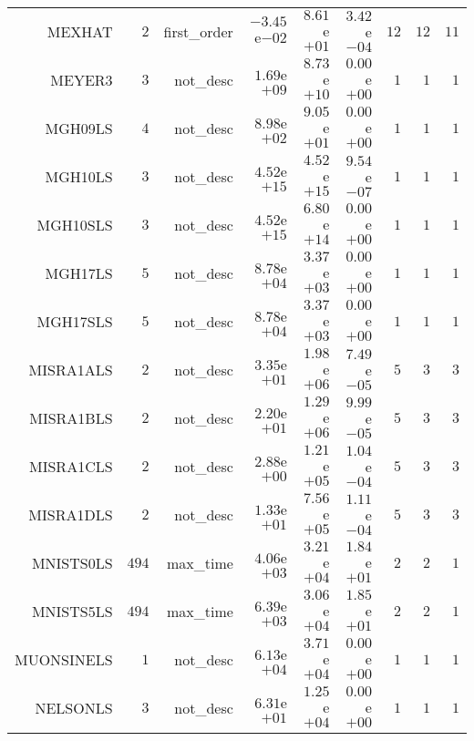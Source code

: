 \begin{longtable}{rrrrrrrrr}
MEXHAT & \(     2\) & first\_order & \(-3.45\)e\(-02\) & \( 8.61\)e\(+01\) & \( 3.42\)e\(-04\) & \(    12\) & \(    12\) & \(    11\) \\
MEYER3 & \(     3\) & not\_desc & \( 1.69\)e\(+09\) & \( 8.73\)e\(+10\) & \( 0.00\)e\(+00\) & \(     1\) & \(     1\) & \(     1\) \\
MGH09LS & \(     4\) & not\_desc & \( 8.98\)e\(+02\) & \( 9.05\)e\(+01\) & \( 0.00\)e\(+00\) & \(     1\) & \(     1\) & \(     1\) \\
MGH10LS & \(     3\) & not\_desc & \( 4.52\)e\(+15\) & \( 4.52\)e\(+15\) & \( 9.54\)e\(-07\) & \(     1\) & \(     1\) & \(     1\) \\
MGH10SLS & \(     3\) & not\_desc & \( 4.52\)e\(+15\) & \( 6.80\)e\(+14\) & \( 0.00\)e\(+00\) & \(     1\) & \(     1\) & \(     1\) \\
MGH17LS & \(     5\) & not\_desc & \( 8.78\)e\(+04\) & \( 3.37\)e\(+03\) & \( 0.00\)e\(+00\) & \(     1\) & \(     1\) & \(     1\) \\
MGH17SLS & \(     5\) & not\_desc & \( 8.78\)e\(+04\) & \( 3.37\)e\(+03\) & \( 0.00\)e\(+00\) & \(     1\) & \(     1\) & \(     1\) \\
MISRA1ALS & \(     2\) & not\_desc & \( 3.35\)e\(+01\) & \( 1.98\)e\(+06\) & \( 7.49\)e\(-05\) & \(     5\) & \(     3\) & \(     3\) \\
MISRA1BLS & \(     2\) & not\_desc & \( 2.20\)e\(+01\) & \( 1.29\)e\(+06\) & \( 9.99\)e\(-05\) & \(     5\) & \(     3\) & \(     3\) \\
MISRA1CLS & \(     2\) & not\_desc & \( 2.88\)e\(+00\) & \( 1.21\)e\(+05\) & \( 1.04\)e\(-04\) & \(     5\) & \(     3\) & \(     3\) \\
MISRA1DLS & \(     2\) & not\_desc & \( 1.33\)e\(+01\) & \( 7.56\)e\(+05\) & \( 1.11\)e\(-04\) & \(     5\) & \(     3\) & \(     3\) \\
MNISTS0LS & \(   494\) & max\_time & \( 4.06\)e\(+03\) & \( 3.21\)e\(+04\) & \( 1.84\)e\(+01\) & \(     2\) & \(     2\) & \(     1\) \\
MNISTS5LS & \(   494\) & max\_time & \( 6.39\)e\(+03\) & \( 3.06\)e\(+04\) & \( 1.85\)e\(+01\) & \(     2\) & \(     2\) & \(     1\) \\
MUONSINELS & \(     1\) & not\_desc & \( 6.13\)e\(+04\) & \( 3.71\)e\(+04\) & \( 0.00\)e\(+00\) & \(     1\) & \(     1\) & \(     1\) \\
NELSONLS & \(     3\) & not\_desc & \( 6.31\)e\(+01\) & \( 1.25\)e\(+04\) & \( 0.00\)e\(+00\) & \(     1\) & \(     1\) & \(     1\) \\

\end{longtable}
